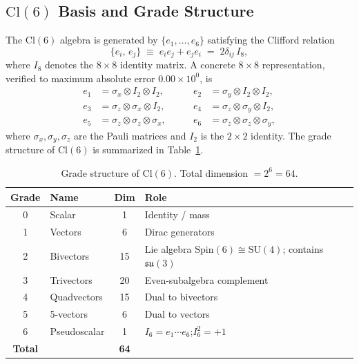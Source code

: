 \documentclass[12pt]{article}
\newcommand{\cl}{\mathrm{Cl}}          %
\newcommand{\spin}{\mathrm{Spin}}
\newcommand{\su}{\mathrm{SU}}
\begin{document}
\subsection{\texorpdfstring{$\cl(6)$}{Cl(6)} Basis and Grade Structure}
\label{sec:basis}

The $\cl(6)$ algebra is generated by $\{e_1,\ldots,e_6\}$ satisfying
the Clifford relation
\begin{equation}
  \{e_i,\,e_j\} \;\equiv\; e_i e_j + e_j e_i \;=\; 2\delta_{ij}\,I_8,
  \label{eq:anticomm}
\end{equation}
where $I_8$ denotes the $8\times 8$ identity matrix.  A concrete
$8\times 8$ representation, verified to maximum absolute error
$0.00\times10^{0}$, is
\begin{equation}
\begin{aligned}
  e_1 &= \sigma_x\otimes I_2\otimes I_2, &\qquad
  e_2 &= \sigma_y\otimes I_2\otimes I_2, \\
  e_3 &= \sigma_z\otimes\sigma_x\otimes I_2, &\qquad
  e_4 &= \sigma_z\otimes\sigma_y\otimes I_2, \\
  e_5 &= \sigma_z\otimes\sigma_z\otimes\sigma_x, &\qquad
  e_6 &= \sigma_z\otimes\sigma_z\otimes\sigma_y,
\end{aligned}
\label{eq:basis}
\end{equation}
where $\sigma_x,\sigma_y,\sigma_z$ are the Pauli matrices and $I_2$ is
the $2\times2$ identity.  The grade structure of $\cl(6)$ is summarized
in Table~\ref{tab:grade}.

\begin{table}[ht]
\centering
\caption{Grade structure of $\cl(6)$.  Total dimension $= 2^6 = 64$.}
\label{tab:grade}
\begin{tabular}{@{}clcl@{}}
  \toprule
  \textbf{Grade} & \textbf{Name} & \textbf{Dim} & \textbf{Role} \\
  \midrule
  0 & Scalar       &  1 & Identity / mass \\
  1 & Vectors      &  6 & Dirac generators \\
  2 & Bivectors    & 15 & Lie algebra $\spin(6)\cong\su(4)$;
                          contains $\mathfrak{su}(3)$ \\
  3 & Trivectors   & 20 & Even-subalgebra complement \\
  4 & Quadvectors  & 15 & Dual to bivectors \\
  5 & 5-vectors    &  6 & Dual to vectors \\
  6 & Pseudoscalar &  1 & $I_6 = e_1\cdots e_6$;\quad $I_6^2 = +1$ \\
  \midrule
  \textbf{Total} & & \textbf{64} & \\
  \bottomrule
\end{tabular}
\end{table}
\end{document}
